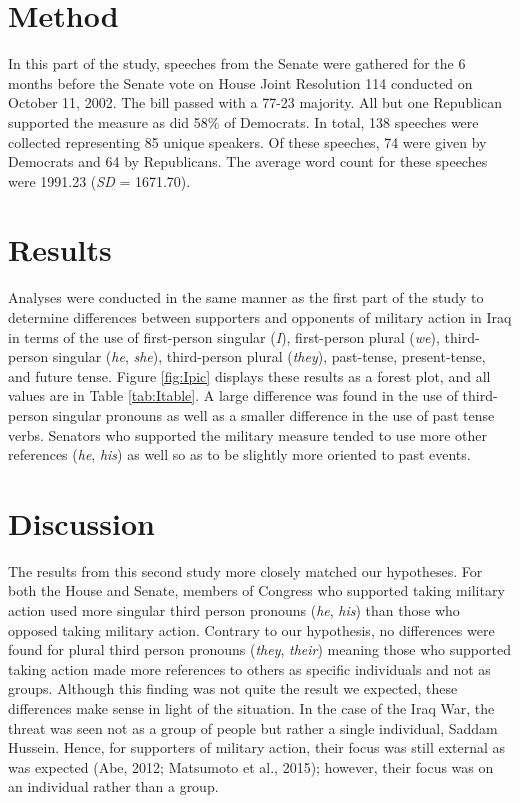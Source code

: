 \documentclass[english,,man]{apa6}
\theoremstyle{definition}
\theoremstyle{definition}
\theoremstyle{definition}
\theoremstyle{remark}
\begin{document}
\hypertarget{method-4}{%
\section{Method}\label{method-4}}

In this part of the study, speeches from the Senate were gathered for
the 6 months before the Senate vote on House Joint Resolution 114
conducted on October 11, 2002. The bill passed with a 77-23 majority.
All but one Republican supported the measure as did 58\% of Democrats.
In total, 138 speeches were collected representing 85 unique speakers.
Of these speeches, 74 were given by Democrats and 64 by Republicans. The
average word count for these speeches were 1991.23 (\emph{SD} =
1671.70).

\hypertarget{results-3}{%
\section{Results}\label{results-3}}

Analyses were conducted in the same manner as the first part of the
study to determine differences between supporters and opponents of
military action in Iraq in terms of the use of first-person singular
(\emph{I}), first-person plural (\emph{we}), third-person singular
(\emph{he}, \emph{she}), third-person plural (\emph{they}), past-tense,
present-tense, and future tense. Figure \ref{fig:Ipic} displays these
results as a forest plot, and all values are in Table \ref{tab:Itable}.
A large difference was found in the use of third-person singular
pronouns as well as a smaller difference in the use of past tense verbs.
Senators who supported the military measure tended to use more other
references (\emph{he}, \emph{his}) as well so as to be slightly more
oriented to past events.

\hypertarget{discussion-1}{%
\section{Discussion}\label{discussion-1}}

The results from this second study more closely matched our hypotheses.
For both the House and Senate, members of Congress who supported taking
military action used more singular third person pronouns (\emph{he},
\emph{his}) than those who opposed taking military action. Contrary to
our hypothesis, no differences were found for plural third person
pronouns (\emph{they}, \emph{their}) meaning those who supported taking
action made more references to others as specific individuals and not as
groups. Although this finding was not quite the result we expected,
these differences make sense in light of the situation. In the case of
the Iraq War, the threat was seen not as a group of people but rather a
single individual, Saddam Hussein. Hence, for supporters of military
action, their focus was still external as was expected (Abe, 2012;
Matsumoto et al., 2015); however, their focus was on an individual
rather than a group.
\end{document}
